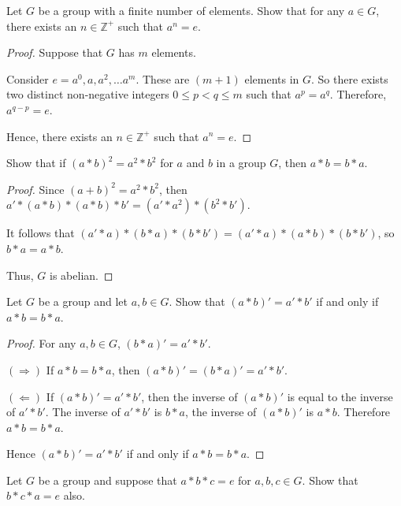 \begin{exercise}
    Let $G$ be a group with a finite number of elements. Show that for any $a\in G$, there exists an $n\in\mathbb{Z}^{+}$ such that $a^{n} = e$.
\end{exercise}

\begin{proof}
    Suppose that $G$ has $m$ elements.

    Consider $e = a^{0}, a, a^{2}, \ldots a^{m}$. These are $(m + 1)$ elements in $G$. So there exists two distinct non-negative integers $0\le p < q\le m$ such that $a^{p} = a^{q}$. Therefore, $a^{q-p} = e$.

    Hence, there exists an $n\in\mathbb{Z}^{+}$ such that $a^{n} = e$.
\end{proof}

\begin{exercise}
    Show that if ${(a * b)}^{2} = a^{2} * b^{2}$ for $a$ and $b$ in a group $G$, then $a * b = b * a$.
\end{exercise}

\begin{proof}
    Since ${(a + b)}^{2} = a^{2} * b^{2}$, then $a' * (a * b) * (a * b) * b' = (a' * a^{2}) * (b^{2} * b')$.

    It follows that $(a' * a) * (b * a) * (b * b') = (a' * a) * (a * b) * (b * b')$, so $b * a = a * b$.

    Thus, $G$ is abelian.
\end{proof}

\begin{exercise}
    Let $G$ be a group and let $a, b\in G$. Show that ${(a * b)}' = a' * b'$ if and only if $a * b = b * a$.
\end{exercise}

\begin{proof}
    For any $a, b\in G$, $(b * a)' = a' * b'$.

    $(\Rightarrow)$ If $a * b = b * a$, then $(a * b)' = (b * a)' = a' * b'$.

    $(\Leftarrow)$ If ${(a * b)}' = a' * b'$, then the inverse of ${(a * b)}'$ is equal to the inverse of $a' * b'$. The inverse of $a' * b'$ is $b * a$, the inverse of ${(a * b)}'$ is $a * b$. Therefore $a * b = b * a$.

    Hence ${(a * b)}' = a' * b'$ if and only if $a * b = b * a$.
\end{proof}

\begin{exercise}
    Let $G$ be a group and suppose that $a * b * c = e$ for $a, b, c\in G$. Show that $b * c * a = e$ also.
\end{exercise}

